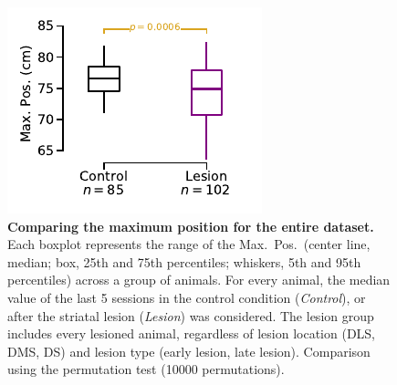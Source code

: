 \begin{figure}[!h]
  \begin{center}
    \includegraphics[scale=1]{ch-appendicies/figures/AllRatMaxPos.pdf}
    \caption[Group Max.\ Pos.\ Comparison]
    {\textbf{Comparing the maximum position for the entire dataset.}
    Each boxplot represents the range of the Max.\ Pos.\ (center line, median; box, 25th and 75th percentiles; whiskers, 5th and 95th percentiles) across a group of animals.
    For every animal, the median value of the last 5 sessions in the control condition (\textit{Control}), or after the striatal lesion (\textit{Lesion}) was considered.
    The lesion group includes every lesioned animal, regardless of lesion location (DLS, DMS, DS) and lesion type (early lesion, late lesion).
    Comparison using the permutation test (10000 permutations).
    }
    \label{fig:appendix:AllRatMaxPos}
  \end{center}
\end{figure} 